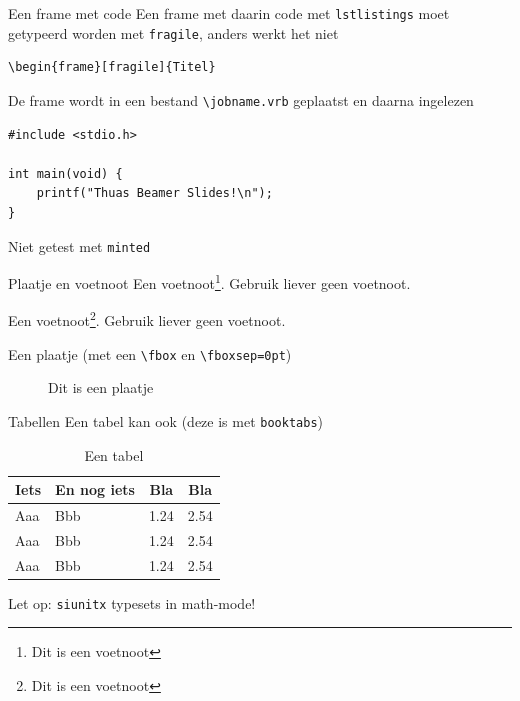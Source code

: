 \documentclass[fleqn,aspectratio=169,dutch]{beamer}
\begin{document}
\begin{frame}[fragile]{Een frame met code}
Een frame met daarin code met \texttt{lstlistings} moet getypeerd worden met \texttt{fragile}, anders werkt het niet

\begin{lstlisting}
\begin{frame}[fragile]{Titel}
\end{lstlisting}

De frame wordt in een bestand \lstinline|\jobname.vrb| geplaatst en daarna ingelezen

\begin{lstlisting}
#include <stdio.h>

int main(void) {
    printf("Thuas Beamer Slides!\n");
}
\end{lstlisting}

Niet getest met \lstinline|minted|
\end{frame}

\begin{frame}[fragile]{Plaatje en voetnoot}
Een voetnoot\footnote{Dit is een voetnoot}. Gebruik liever geen voetnoot.

Een voetnoot\footnote{Dit is een voetnoot}. Gebruik liever geen voetnoot.

Een plaatje (met een \lstinline|\fbox| en \lstinline|\fboxsep=0pt|)

\begin{figure}
\fboxsep=0pt
\caption{Dit is een plaatje}
\end{figure}

\end{frame}

\begin{frame}{Tabellen}
Een tabel kan ook (deze is met \texttt{booktabs})

\begin{table}[!ht]
\caption{Een tabel}
\begin{tabular}{llcc}
\toprule
Iets & En nog iets & Bla & Bla \\
\midrule
Aaa & Bbb & 1.24 & 2.54 \\
Aaa & Bbb & 1.24 & 2.54 \\
Aaa & Bbb & 1.24 & 2.54 \\
\bottomrule
\end{tabular}
\end{table}

Let op: \texttt{siunitx} typesets in math-mode!
\end{frame}
\end{document}
